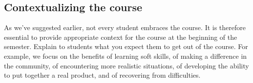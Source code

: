 \subsection{Contextualizing the course}

As we've suggested earlier, not every student embraces the course.  It
is therefore essential to provide appropriate context for the course at
the beginning of the semester.  Explain to students what you expect them
to get out of the course.  For example, we focus on the benefits of learning
soft skills, of making a difference in the community, of encountering
more realistic situations, of developing the ability to put together a
real product, and of recovering from difficulties.
